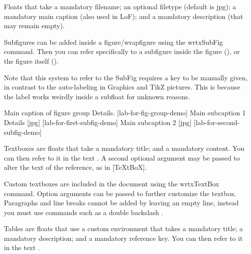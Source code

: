 \lipsum[1]


Floats that take a mandatory filename; an optional filetype (default is jpg); a mandatory main caption (also used in LoF); and a mandatory description (that may remain empty).

Subfigures can be added inside a figure/wrapfigure using the wrtxSubFig command. Then you can refer specifically to a subfigure inside the figure (), or the figure itself ().

Note that this system to refer to the SubFig requires a key to be manually given, in contrast to the auto-labeling in Graphics and TikZ pictures.
This is because the label works weirdly inside a subfloat for unknown reasons.


\begin{wrtxFigEnv}[][width=1\linewidth]
  {Main caption of figure group} %
  {Details.}%
  [lab-for-fig-group-demo]
  \wrtxSubfig
  {Main subcaption 1}%
  {Details}%
  {%
    [jpg]%
  }%
  [lab-for-first-subfig-demo]
  \hfill
  \wrtxSubfig
  {Main subcaption 2}%
  {}%
  {%
    [jpg]%
  }%
  [lab-for-second-subfig-demo]
\end{wrtxFigEnv}


Textboxes are floats that take a mandatory title; and a mandatory content.
You can then refer to it in the text . A second optional argument may be passed to alter the text of the reference, as in [TeXtBoX].

{
Custom textboxes are included in the document using the wrtxTextBox command. Option arguments can be passed to further customize the textbox.
\\%
Paragraphs and line breaks cannot be added by leaving an empty line, instead you must use commands such as a double backslash \detokenize{\\}.
}

Tables are floats that use a custom environment that takes a mandatory title; a mandatory description; and a mandatory reference key.
You can then refer to it in the text .


